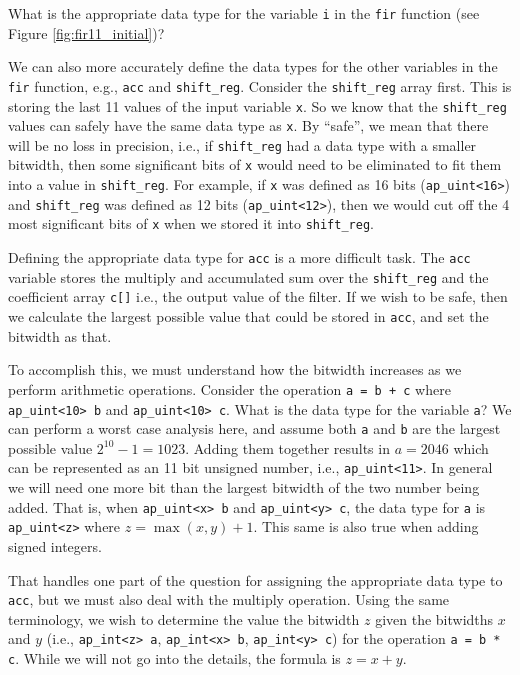 \begin{exercise}
What is the appropriate data type for the variable \lstinline{i} in the \lstinline{fir} function (see Figure \ref{fig:fir11_initial})?
\end{exercise}

We can also more accurately define the data types for the other variables in the \lstinline{fir} function, e.g., \lstinline{acc} and \lstinline{shift_reg}. Consider the \lstinline{shift_reg} array first. This is storing the last 11 values of the input variable \lstinline{x}. So we know that the \lstinline{shift_reg} values can safely have the same data type as \lstinline{x}. By ``safe'', we mean that there will be no loss in precision, i.e., if \lstinline{shift_reg} had a data type with a smaller bitwidth, then some significant bits of \lstinline{x} would need to be eliminated to fit them into a value in \lstinline{shift_reg}. For example, if \lstinline{x} was defined as 16 bits (\lstinline{ap_uint<16>}) and \lstinline{shift_reg} was defined as 12 bits (\lstinline{ap_uint<12>}), then we would cut off the 4 most significant bits of \lstinline{x} when we stored it into \lstinline{shift_reg}. 

Defining the appropriate data type for \lstinline{acc} is a more difficult task. The \lstinline{acc} variable stores the multiply and accumulated sum over the \lstinline{shift_reg} and the coefficient array \lstinline{c[]} i.e., the output value of the filter. If we wish to be safe, then we calculate the largest possible value that could be stored in \lstinline{acc}, and set the bitwidth as that. 

To accomplish this, we must understand how the bitwidth increases as we perform arithmetic operations. Consider the operation \lstinline{a = b + c} where \lstinline{ap_uint<10> b} and \lstinline{ap_uint<10> c}. What is the data type for the variable \lstinline{a}? We can perform a worst case analysis here, and assume both \lstinline{a} and \lstinline{b} are the largest possible value $2^{10}-1 = 1023$. Adding them together results in $a = 2046$ which can be represented as an 11 bit unsigned number, i.e., \lstinline{ap_uint<11>}. In general we will need one more bit than the largest bitwidth of the two number being added. That is, when  \lstinline{ap_uint<x> b} and \lstinline{ap_uint<y> c}, the data type for \lstinline{a} is \lstinline{ap_uint<z>} where $z = \max(x,y) + 1$. This same is also true when adding signed integers. 

That handles one part of the question for assigning the appropriate data type to \lstinline{acc}, but we must also deal with the multiply operation. Using the same terminology, we wish to determine the value the bitwidth $z$ given the bitwidths $x$ and $y$ (i.e., \lstinline{ap_int<z> a}, \lstinline{ap_int<x> b}, \lstinline{ap_int<y> c}) for the operation \lstinline{a = b * c}. While we will not go into the details, the formula is $z = x + y$. 

